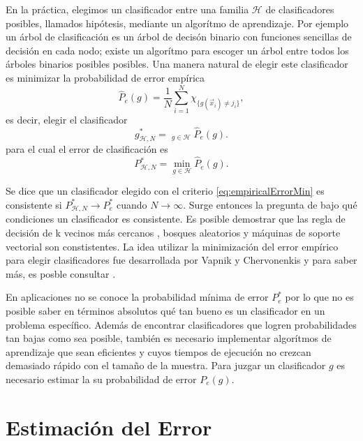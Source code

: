 \documentclass[letterpaper,12pt]{book}
\DeclareMathOperator*{\argmin}{arg\,m\acute{i}n}
\begin{document}
En la práctica, elegimos un clasificador entre una familia $\mathcal{H}$ de clasificadores posibles, llamados hipótesis, mediante un algorítmo de aprendizaje. Por ejemplo un árbol de clasificación es un árbol de decisón binario con funciones sencillas de decisión en cada nodo; existe un algorítmo para  escoger un árbol entre todos los árboles binarios posibles posibles. Una manera natural de elegir este clasificador es minimizar la probabilidad de error empírica
\begin{equation}
\hat{P}_{e}(g) = \frac{1}{N}\sum_{i=1}^{N}\chi_{\{g(\vec{x}_i)\neq j_{i}\}},
\end{equation}
es decir, elegir el clasificador
\begin{equation}\label{eq:empiricalErrorMin}
  g_{\mathcal{H}, N}^{*} = \argmin_{g\in\mathcal{H}} \hat{P}_{e}(g).
\end{equation} 
para el cual el error de clasificación es
\begin{equation}
  P_{\mathcal{H}, N}^{*} = \min_{g\in\mathcal{H}} \hat{P}_{e}(g).
\end{equation}

Se dice que un clasificador elegido con el criterio  \ref{eq:empiricalErrorMin} es consistente si $P_{\mathcal{H},N}^{*}\to P_e^*$ cuando $N\to\infty$.
Surge entonces la pregunta de bajo qué condiciones un clasificador es consistente. Es posible demostrar que las regla de decisión de k vecinos más cercanos \cite{devroye_probabilistic_1996}, bosques aleatorios \cite{biau_consistency_2008} y máquinas de soporte vectorial \cite{steinwart_consistency_2005} son constistentes. La idea utilizar la minimización del error empírico para elegir clasificadores fue desarrollada por Vapnik y Chervonenkis  y para saber más, es posble consultar \cite{devroye_probabilistic_1996}.

En aplicaciones no se conoce la probabilidad mínima de error $P_e^*$ por lo que no es posible saber en términos absolutos qué tan bueno es un clasificador en un problema específico. Además de encontrar clasificadores que logren probabilidades tan bajas como sea posible, también es necesario implementar algorítmos de aprendizaje que sean eficientes y cuyos tiempos de ejecución no crezcan demasiado rápido con el tamaño de la muestra. Para juzgar un clasificador $g$ es necesario estimar la su probabilidad de error $P_e(g)$.

\section{Estimación del Error}
\end{document}
